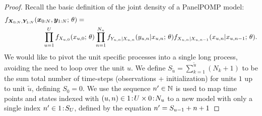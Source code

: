   \begin{proof} 
  Recall the basic definition of the joint density of a PanelPOMP model: 
  \begin{align}
&f_{\bm{X}_{0:N}, \bm{Y}_{1:N}}(\bm{x}_{0:N}, \bm{y}_{1:N}; \, \theta) =
\nonumber
\\
& \hspace{20mm} \prod_{u = 1}^Uf_{X_{u, 0}}(x_{u, 0};\, \theta) 
\prod_{n = 1}^{N_u}f_{Y_{u, n}|X_{u, n}}(y_{u, n} | x_{u, n} ;\, \theta)f_{X_{u, n} | X_{u, n-1}}(x_{u, n}|x_{u, n-1}; \, \theta). \label{eq:ppompSI}
\end{align}
  We would like to pivot the unit specific processes into a single long process, avoiding the need to loop over the unit $u$.
  We define $S_{\tilde{u}} = \sum_{k = 1}^{\tilde{u}}(N_k + 1)$ to be the sum total number of time-steps (observations + initialization) for units $1$ up to unit $\tilde{u}$, defining $S_0 = 0$.
  We use the sequence $n' \in \mathbb{N}$ is used to map time points and states indexed with $(u, n) \in {1}\!:\!{U}\times{0}\!:\!{N_u}$ to a new model with only a single index $n' \in {1}\!:\!{S_U}$, defined by the equation $n' = S_{u-1} + n + 1$
  

\end{proof}
